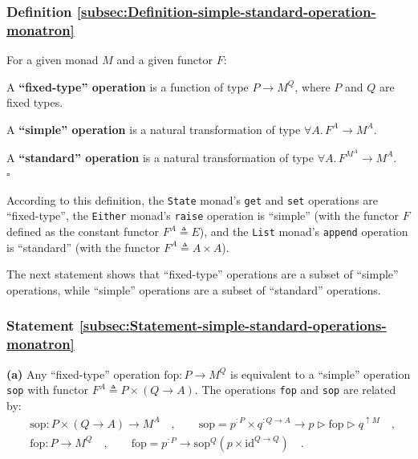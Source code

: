 \subsubsection{Definition \label{subsec:Definition-simple-standard-operation-monatron}\ref{subsec:Definition-simple-standard-operation-monatron}}

For a given monad $M$ and a given functor $F$:

A \textbf{\textsf{``}fixed-type\textsf{''} operation} is a function of type $P\rightarrow M^{Q}$,
where $P$ and $Q$ are fixed types.

A \textbf{\textsf{``}simple\textsf{''} operation} is a natural transformation of type
$\forall A.\,F^{A}\rightarrow M^{A}$.

A \textbf{\textsf{``}standard\textsf{''} operation} is a natural transformation of
type $\forall A.\,F^{M^{A}}\rightarrow M^{A}$.\\
$\square$

According to this definition, the \lstinline!State! monad\textsf{'}s \lstinline!get!
and \lstinline!set! operations are \textsf{``}fixed-type\textsf{''}, the \lstinline!Either!
monad\textsf{'}s \lstinline!raise! operation is \textsf{``}simple\textsf{''} (with the functor
$F$ defined as the constant functor $F^{A}\triangleq E$), and the
\lstinline!List! monad\textsf{'}s \lstinline!append! operation is \textsf{``}standard\textsf{''}
(with the functor $F^{A}\triangleq A\times A$). 

The next statement shows that \textsf{``}fixed-type\textsf{''} operations are a subset
of \textsf{``}simple\textsf{''} operations, while \textsf{``}simple\textsf{''} operations are a subset
of \textsf{``}standard\textsf{''} operations.

\subsubsection{Statement \label{subsec:Statement-simple-standard-operations-monatron}\ref{subsec:Statement-simple-standard-operations-monatron}}

\textbf{(a)} Any \textsf{``}fixed-type\textsf{''} operation $\text{fop}:P\rightarrow M^{Q}$
is  equivalent to a \textsf{``}simple\textsf{''} operation \lstinline!sop! with functor
$F^{A}\triangleq P\times\left(Q\rightarrow A\right)$. The operations
\lstinline!fop! and \lstinline!sop! are related by:
\begin{align*}
 & \text{sop}:P\times\left(Q\rightarrow A\right)\rightarrow M^{A}\quad,\quad\quad\text{sop}=p^{:P}\times q^{:Q\rightarrow A}\rightarrow p\triangleright\text{fop}\triangleright q^{\uparrow M}\quad,\\
 & \text{fop}:P\rightarrow M^{Q}\quad,\quad\quad\text{fop}=p^{:P}\rightarrow\text{sop}^{Q}(p\times\text{id}^{Q\rightarrow Q})\quad.
\end{align*}

